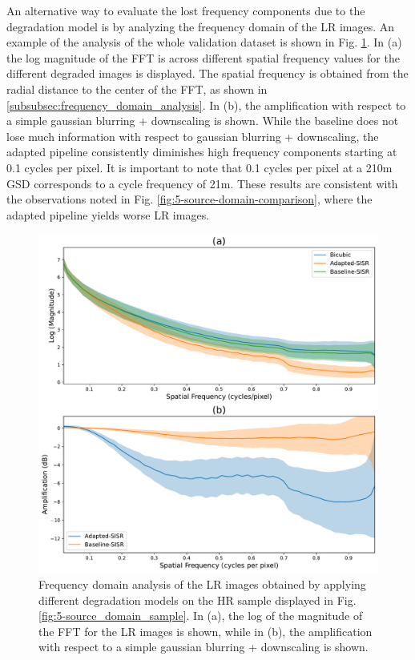         An alternative way to evaluate the lost frequency components due to the degradation model is by analyzing the frequency domain of the LR images.
        An example of the analysis of the whole validation dataset is shown in Fig. \ref{fig:5-lr-images-fft-comparison}. 
        In (a) the log magnitude of the FFT is across different spatial frequency values for the different degraded images is displayed. 
        The spatial frequency is obtained from the radial distance to the center of the FFT, as shown in \ref{subsubsec:frequency_domain_analysis}.
        In (b), the amplification with respect to a simple gaussian blurring + downscaling is shown. 
        While the baseline does not lose much information with respect to gaussian blurring + downscaling, the adapted pipeline consistently diminishes high frequency components starting at 0.1 cycles per pixel. 
        It is important to note that 0.1 cycles per pixel at a 210m GSD corresponds to a cycle frequency of 21m.
        These results are consistent with the observations noted in Fig. \ref{fig:5-source-domain-comparison}, where the adapted pipeline yields worse LR images.
    
        \begin{figure}[H]
            \centering
            \includegraphics[scale=0.5]{Includes/5-source-lr-amplification-statistics.pdf}
            \caption{Frequency domain analysis of the LR images obtained by applying different degradation models on the HR sample displayed in Fig. \ref{fig:5-source_domain_sample}.
                     In (a), the log of the magnitude of the FFT for the LR images is shown,
                     while in (b), the amplification with respect to a  simple gaussian blurring + downscaling is shown.}
            \label{fig:5-lr-images-fft-comparison}
        \end{figure}

